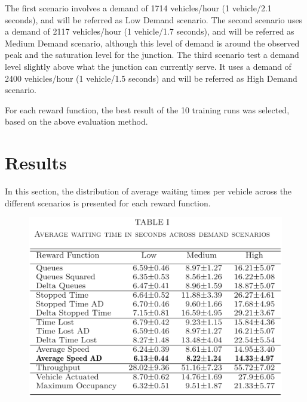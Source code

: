 \documentclass{article}
\begin{document}
The first scenario involves a demand of 1714 vehicles/hour (1 vehicle/2.1 seconds), and will be referred as Low Demand scenario.
The second scenario uses a demand of 2117 vehicles/hour (1 vehicle/1.7 seconds), and will be referred as Medium Demand scenario, although this level of demand is around the observed peak and the saturation level for the junction.
The third scenario test a demand level slightly above what the junction can currently serve. It uses a demand of 2400 vehicles/hour (1 vehicle/1.5 seconds) and will be referred as High Demand scenario.

For each reward function, the best result of the 10 training runs was selected, based on the above evaluation method.

\section{Results}\label{results}
In this section, the distribution of average waiting times per vehicle across the different scenarios is presented for each reward function.

\begin{figure}[thpb]
    \centering
    \includegraphics[width=0.7\linewidth]{figures/table.png}
    \label{fig:table}
\end{figure}
\end{document}
